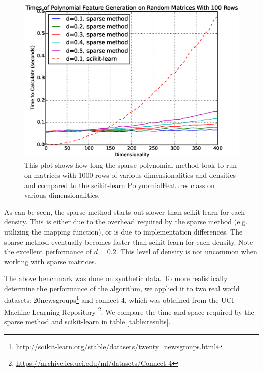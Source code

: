 \documentclass[11pt,twocolumn]{article}
\begin{document}
\begin{figure}[ht, numbered]
    \includegraphics[scale=0.4]{benchmark.eps}
    \caption{This plot shows how long the sparse polynomial method took to run on matrices with 1000 rows of various dimensionalities and densities and compared to the scikit-learn PolynomialFeatures class on various dimensionalities.}
    \label{fig:benchmark}
    \centering
\end{figure}

As can be seen, the sparse method starts out slower than scikit-learn for each density. This
is either due to the overhead required by the sparse method (e.g. utilizing the mapping function),
or is due to implementation differences. The sparse method eventually becomes faster than scikit-learn
for each density. Note the excellent performance of $d=0.2$. This level of density is not uncommon when
working with sparse matrices.

The above benchmark was done on synthetic data. To more realistically determine the performance of
the algorithm, we applied it to two real world datasets: 20newsgroups\footnote{\url{http://scikit-learn.org/stable/datasets/twenty_newsgroups.html}} and connect-4, which was obtained
from the UCI Machine Learning Repository \cite{Lichman:2013}\footnote{\url{https://archive.ics.uci.edu/ml/datasets/Connect-4}}. We compare the time and space required by the sparse method and scikit-learn in table \eqref{table:results}.
\end{document}
